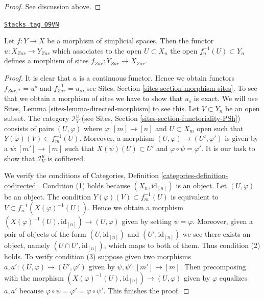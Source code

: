 \begin{proof}
See discussion above.
\end{proof}

\begin{lemma}
\label{spaces-simplicial-lemma-simplicial-space-site-functorial}
\href{https://stacks.math.columbia.edu/tag/09VN}{\texttt{Stacks tag 09VN}}

Let $f : Y \to X$ be a morphism of simplicial spaces.
Then the functor $u : X_{Zar} \to Y_{Zar}$
which associates to the open $U \subset X_n$ the open
$f_n^{-1}(U) \subset Y_n$ defines a morphism of sites
$f_{Zar} : Y_{Zar} \to X_{Zar}$.
\end{lemma}

\begin{proof}
It is clear that $u$ is a continuous functor. Hence we obtain functors
$f_{Zar, *} = u^s$ and $f_{Zar}^{-1} = u_s$, see
Sites, Section \ref{sites-section-morphism-sites}.
To see that we obtain a morphism of sites we have to show
that $u_s$ is exact. We will use
Sites, Lemma \ref{sites-lemma-directed-morphism} to see this.
Let $V \subset Y_n$ be an open subset. The category
$\mathcal{I}_V^u$ (see Sites, Section \ref{sites-section-functoriality-PSh})
consists of pairs $(U, \varphi)$ where
$\varphi : [m] \to [n]$ and $U \subset X_m$ open such that
$Y(\varphi)(V) \subset f_m^{-1}(U)$. Moreover, a morphism
$(U, \varphi) \to (U', \varphi')$ is given by a
$\psi : [m'] \to [m]$ such that $X(\psi)(U) \subset U'$
and $\varphi \circ \psi = \varphi'$.
It is our task to show that $\mathcal{I}_V^u$ is cofiltered.

\medskip\noindent
We verify the conditions of
Categories, Definition \ref{categories-definition-codirected}.
Condition (1) holds because $(X_n, \text{id}_{[n]})$ is an object.
Let $(U, \varphi)$ be an object. The condition
$Y(\varphi)(V) \subset f_m^{-1}(U)$ is equivalent to
$V \subset f_n^{-1}(X(\varphi)^{-1}(U))$. Hence we obtain a morphism
$(X(\varphi)^{-1}(U), \text{id}_{[n]}) \to (U, \varphi)$ given
by setting $\psi = \varphi$. Moreover, given a pair of objects
of the form $(U, \text{id}_{[n]})$ and $(U', \text{id}_{[n]})$
we see there exists an object, namely $(U \cap U', \text{id}_{[n]})$,
which maps to both of them. Thus condition (2) holds.
To verify condition (3) suppose given two morphisms
$a, a': (U, \varphi) \to (U', \varphi')$ given by $\psi, \psi' : [m'] \to [m]$.
Then precomposing with the morphism
$(X(\varphi)^{-1}(U), \text{id}_{[n]}) \to (U, \varphi)$ given
by $\varphi$ equalizes $a, a'$ because
$\varphi \circ \psi = \varphi' = \varphi \circ \psi'$.
This finishes the proof.
\end{proof}

